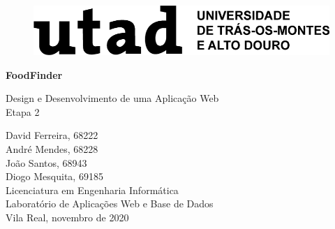 \documentclass[a4paper,12pt]{report}
\begin{document}
	
	\begin{titlepage}
		\begin{center}
		
		\begin{figure}[H]
		\begin{center}
			\includegraphics[scale=0.45]{logo_utad_completo_preto}	
		\end{center}
		\label{fig:logoUTAD}	
		\end{figure}
		
		\vspace{3cm}
		\huge
		\textbf{FoodFinder}
		
		\Large
		Design e Desenvolvimento de uma Aplicação Web\\
		Etapa 2
		
		
		\vspace{2.5cm}
		\large
		David Ferreira, 68222\\
		André Mendes, 68228\\
		João Santos, 68943\\
		Diogo Mesquita, 69185\\
		
		\vspace{2.5cm}
		Licenciatura em Engenharia Informática\\
		Laboratório de Aplicações Web e Base de Dados \\
		
		\vspace{1.5cm}		
		Vila Real, novembro de 2020
		
		\end{center}
	\end{titlepage}	
	
	
	
	
	
	
	
\end{document}
